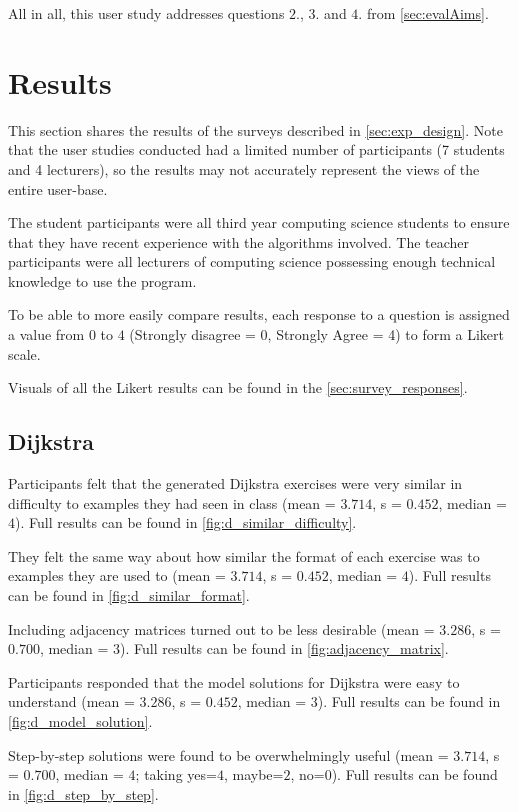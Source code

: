 \documentclass{l4proj}
\begin{document}
All in all, this user study addresses questions $2.$, $3.$ and $4.$ from \autoref{sec:evalAims}.

\section{Results}
\label{sec:results}

This section shares the results of the surveys described in \autoref{sec:exp_design}. Note that the user studies conducted had a limited number of participants (7 students and 4 lecturers), so the results may not accurately represent the views of the entire user-base.

The student participants were all third year computing science students to ensure that they have recent experience with the algorithms involved. The teacher participants were all lecturers of computing science possessing enough technical knowledge to use the program.

To be able to more easily compare results, each response to a question is assigned a value from $0$ to $4$ (Strongly disagree = 0, Strongly Agree = 4) to form a Likert scale.

Visuals of all the Likert results can be found in the \autoref{sec:survey_responses}.

\subsection{Dijkstra}
\label{sec:d_results}

Participants felt that the generated Dijkstra exercises were very similar in difficulty to examples they had seen in class (mean = $3.714$, s = $0.452$, median = $4$). Full results can be found in \autoref{fig:d_similar_difficulty}.

They felt the same way about how similar the format of each exercise was to examples they are used to (mean = $3.714$, s = $0.452$, median = $4$). Full results can be found in \autoref{fig:d_similar_format}.

Including adjacency matrices turned out to be less desirable (mean = $3.286$, s = $0.700$, median = $3$). Full results can be found in \autoref{fig:adjacency_matrix}.

Participants responded that the model solutions for Dijkstra were easy to understand (mean = $3.286$, s = $0.452$, median = $3$).  Full results can be found in \autoref{fig:d_model_solution}.

Step-by-step solutions were found to be overwhelmingly useful (mean = $3.714$, s = $0.700$, median = $4$; taking yes=$4$, maybe=$2$, no=$0$).  Full results can be found in \autoref{fig:d_step_by_step}.
\end{document}
